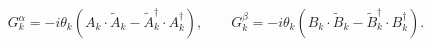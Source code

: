\begin{equation}
G_{k}^{\alpha } =
-i\theta_{k} \left( A_{k}\cdot \tilde{A}_{k}-
\tilde{A}_{k}^{\dagger }\cdot A_{k}^{\dagger }\right) ,
\qquad
G_{k}^{\beta }=
-i\theta_{k} \left( B_{k}\cdot \tilde{B}_{k}-\tilde{B}
_{k}^{\dagger }\cdot B_{k}^{\dagger }\right).
\label{gera2}
\end{equation}

